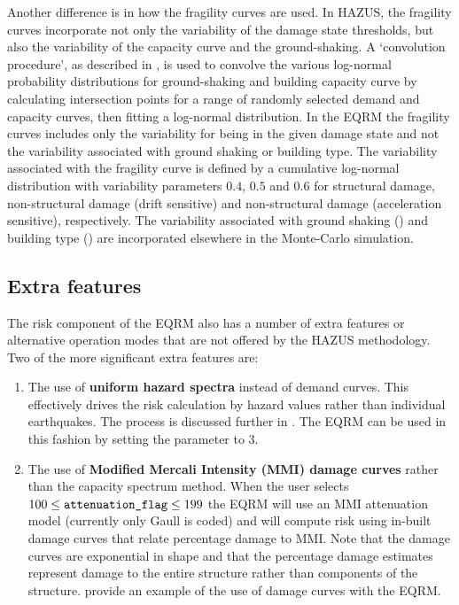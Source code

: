 Another difference is in how the fragility curves are used. In HAZUS, the fragility curves incorporate not only the variability of the damage state
thresholds, but also the variability of the capacity
curve and the ground-shaking. A `convolution
procedure', as described in \cite{dr_Kircher97b}, is used to
convolve the various log-normal probability distributions for
ground-shaking and building capacity curve
by calculating intersection points for a range of randomly
selected demand and capacity curves, then
fitting a log-normal distribution. In the EQRM the fragility
curves includes only the variability for
being in the given damage state and not the variability associated
with ground shaking or building type. The
variability associated with the fragility curve is defined by a cumulative log-normal distribution with
variability parameters $0.4$, $0.5$ and $0.6$ for structural
damage, non-structural damage (drift sensitive) and non-structural
damage (acceleration sensitive), respectively. The variability
associated with ground shaking
() and building
type () are incorporated elsewhere in
the Monte-Carlo simulation.

\subsection{Extra features}

The risk component of the EQRM also has a number of extra features
or alternative operation modes that are not offered by the HAZUS
methodology. Two of the more significant extra features are:
\begin{enumerate}
\item The use of \textbf{uniform hazard spectra} instead of demand
curves. This effectively drives the risk
calculation by hazard values rather than individual earthquakes.
The process is discussed further in \citet{dr_Patchett04a}. The
EQRM can be used in this fashion by setting the
 parameter  to 3.
\item The use of \textbf{Modified Mercali Intensity (MMI) damage
curves} rather than the capacity spectrum method. When the user selects $100 \leq
\typepar{atten}{uation}{\_flag} \leq 199$ the EQRM will use an MMI
attenuation model (currently only Gaull is coded) and will compute
risk using in-built damage curves that relate percentage damage to
MMI. Note that the damage curves are exponential in shape and that
the percentage damage estimates represent damage to the entire
structure rather than components of the structure.
\cite{dr_Edwards04a} provide an example of the use of damage
curves with the EQRM.
\end{enumerate}



